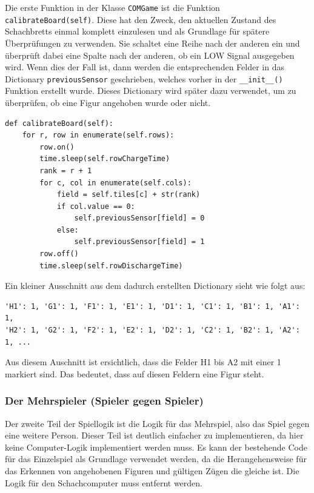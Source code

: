 Die erste Funktion in der Klasse \verb|COMGame| ist die Funktion \verb|calibrateBoard(self)|. Diese hat den Zweck, den 
aktuellen Zustand des Schachbretts einmal komplett einzulesen und als Grundlage für spätere Überprüfungen zu verwenden. 
Sie schaltet eine Reihe nach der anderen ein und überprüft dabei eine Spalte nach der anderen, ob ein LOW Signal 
ausgegeben wird. Wenn dies der Fall ist, dann werden die entsprechenden Felder in das Dictionary \verb|previousSensor| 
geschrieben, welches vorher in der \verb|__init__()| Funktion erstellt wurde. Dieses Dictionary wird später dazu 
verwendet, um zu überprüfen, ob eine Figur angehoben wurde oder nicht.\\

\begin{scriptsize}
\begin{lstlisting}[captionpos=b, caption={Funktion zum Kalibrieren des Schachbretts}]
def calibrateBoard(self):
    for r, row in enumerate(self.rows):
        row.on()
        time.sleep(self.rowChargeTime)
        rank = r + 1
        for c, col in enumerate(self.cols):
            field = self.tiles[c] + str(rank)
            if col.value == 0:
                self.previousSensor[field] = 0
            else:
                self.previousSensor[field] = 1
        row.off()
        time.sleep(self.rowDischargeTime)
\end{lstlisting}
\end{scriptsize}

Ein kleiner Ausschnitt aus dem dadurch erstellten Dictionary sieht wie folgt aus:\\

\begin{scriptsize}
\begin{lstlisting}[captionpos=b, caption={Ausschnitt aus dem Dictionary}]
'H1': 1, 'G1': 1, 'F1': 1, 'E1': 1, 'D1': 1, 'C1': 1, 'B1': 1, 'A1': 1, 
'H2': 1, 'G2': 1, 'F2': 1, 'E2': 1, 'D2': 1, 'C2': 1, 'B2': 1, 'A2': 1, ...
\end{lstlisting}
\end{scriptsize}

Aus diesem Auschnitt ist ersichtlich, dass die Felder H1 bis A2 mit einer 1 markiert sind. Das bedeutet, dass auf diesen 
Feldern eine Figur steht.


\subsubsection{Der Mehrspieler (Spieler gegen Spieler)}
Der zweite Teil der Spiellogik ist die Logik für das Mehrspiel, also das Spiel gegen eine weitere Person. Dieser Teil ist 
deutlich einfacher zu implementieren, da hier keine Computer-Logik implementiert werden muss. Es kann der bestehende 
Code für das Einzelspiel als Grundlage verwendet werden, da die Herangehensweise für das Erkennen von angehobenen 
Figuren und gültigen Zügen die gleiche ist. Die Logik für den Schachcomputer muss entfernt werden.

